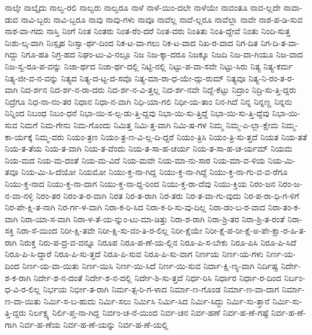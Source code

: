 {ನಾಲ್ಕೇ
ನಾಲ್ಕೈದು
ನಾಲ್ವ-ರಲಿ
ನಾಲ್ವರು
ನಾಲ್ವರೂ
ನಾಳೆ
ನಾಳೆ-ಯಿಂ-ದಲೇ
ನಾಳೆಯೇ
ನಾವಂತೂ
ನಾವ-ಲ್ಲದೇ
ನಾವಾ-ಡುವ
ನಾವಿ-ಬ್ಬರು
ನಾವಿ-ಬ್ಬರೂ
ನಾವು
ನಾವು-ಗಳು
ನಾವೂ
ನಾವೆಲ್ಲ
ನಾವೆ-ಲ್ಲರೂ
ನಾವೆಲ್ಲಾ
ನಾವೇ
ನಾಶ-ಪ-ಡಿ-ಸುವ
ನಾಶ-ವಾ-ಗದು
ನಾಸ್ತಿ
ನಿಂಗೆ
ನಿಂತ
ನಿಂತರು
ನಿಂತ-ರೆಂ-ದರೆ
ನಿಂತ-ವರು
ನಿಂತಿತು
ನಿಂತಿ-ದ್ದೇವೆ
ನಿಂತು
ನಿಂದಿ-ಸುತ್ತ
ನಿಃಶು-ಲ್ಕ-ವಾಗಿ
ನಿಃಸ್ಪೃಹ
ನಿಃಸ್ವಾ-ರ್ಥ-ದಿಂದ
ನಿಕ-ಟ-ವಾ-ಗಲು
ನಿಕ-ಟ-ವಾದ
ನಿಖ-ರ-ವಾದ
ನಿಗ-ದಿತ
ನಿಗ-ದಿ-ತ-ವಾ-ಗಿದ್ದು
ನಿಗೂ-ಹತಿ
ನಿಗ್ರ-ಹದ
ನಿಘಂ-ಟು-ವಿ-ನಲ್ಲೂ
ನಿಜ
ನಿಜ-ಕ್ಕಾ-ದರೂ
ನಿಜಕ್ಕೂ
ನಿಜದಿ
ನಿಜ-ವಾ-ಗಿಯೂ
ನಿಜ-ವಾದ
ನಿಜ-ಸ್ವ-ರೂ-ಪ-ವನ್ನು
ನಿಜಾ-ರ್ಥದ
ನಿಜಾ-ರ್ಥ-ದಲ್ಲಿ
ನಿಟ್ಟಿ-ನಲ್ಲಿ
ನಿಟ್ಟು-ಪ-ವಾ-ಸವೇ
ನಿಟ್ಟು-ಸಿರು
ನಿತ್ಯ
ನಿತ್ಯ-ಕರ್ಮ
ನಿತ್ಯ-ಜೀ-ವ-ನ-ವನ್ನು
ನಿತ್ಯದ
ನಿತ್ಯ-ದ-ಟ್ಟ-ದ-ಸವೊ
ನಿತ್ಯ-ಮಾ-ರಾ-ಧ-ಯೇ-ದ್ಗು-ರುಮ್
ನಿತ್ಯವೂ
ನಿತ್ಯ-ನಿ-ರಂ-ತ-ರ-ವಾಗಿ
ನಿದ-ರ್ಶನ
ನಿದ-ರ್ಶ-ನ-ರಾ-ದರು
ನಿದ-ರ್ಶ-ನ-ವಿ-ತ್ತಲ್ಲ
ನಿದ-ರ್ಶ-ನವೇ
ನಿದ್ದೆ-ಕೆಟ್ಟು
ನಿದ್ರಾಂ
ನಿದ್ರಿ-ಸು-ತ್ತಿ-ದ್ದರು
ನಿದ್ರೆಗೂ
ನಿಧ-ನಾ-ನಂ-ತರ
ನಿಧಾನ
ನಿಧಾ-ನ-ವಾಗಿ
ನಿಧಿ-ಯಾ-ಗಲಿ
ನಿಧೀ-ಯ-ತಾಂ
ನಿನ-ಗಿದೆ
ನಿನ್ನ
ನಿನ್ನಣ್ಣ
ನಿನ್ನನು
ನಿನ್ನಿಂದ
ನಿಬಂಧ
ನಿಬಂ-ಧನೆ
ನಿಭಾ-ಯಿ-ಸ-ಲ್ಪ-ಡು-ತ್ತಿ-ದ್ದವು
ನಿಭಾ-ಯಿ-ಸು-ತ್ತಿದ್ದೆ
ನಿಭಾ-ಯಿ-ಸು-ತ್ತಿ-ದ್ದೆವು
ನಿಭಾ-ಯಿ-ಸುವ
ನಿಮಗೆ
ನಿಮ-ಗೇನು
ನಿಮ-ಗೊಂದು
ನಿಮಿತ್ತ
ನಿಮಿ-ತ್ತ-ವಾಗಿ
ನಿಮಿ-ಷ-ಗಳ
ನಿಮ್ಮ
ನಿಮ್ಮ-ಎ-ಲ್ಲಾ-ಕ್ಷೇಮ
ನಿಮ್ಮ-ಕಾ-ರ್ಯಕ್ಕೆ
ನಿಮ್ಮ-ವರು
ನಿಯಂ-ತ್ರಣ
ನಿಯಂ-ತ್ರ-ಣ-ವಿ-ಲ್ಲ-ದಿ-ದ್ದರೆ
ನಿಯಂ-ತ್ರಿಸಿ
ನಿಯಂ-ತ್ರಿ-ಸು-ತ್ತದೆ
ನಿಯತ
ನಿಯ-ತತೆ
ನಿಯ-ತ-ತೆಯ
ನಿಯ-ತ-ವಾಗಿ
ನಿಯ-ತ-ವೆಂದು
ನಿಯ-ತ-ಸಾ-ಹ-ಚರ್ಯ
ನಿಯ-ತ-ಸಾ-ಹ-ಚ-ರ್ಯಮ್
ನಿಯಮ
ನಿಯ-ಮದ
ನಿಯ-ಮ-ದಂತೆ
ನಿಯ-ಮ-ವಿದೆ
ನಿಯ-ಮವೇ
ನಿಯ-ಮಾ-ನು-ಸಾರ
ನಿಯ-ಮಾ-ವ-ಳಿಯ
ನಿಯ-ಮಿ-ತವೂ
ನಿಯ-ಮಿ-ಸಿ-ದೆಯೋ
ನಿಯಮೋ
ನಿಯು-ಕ್ತ-ನಾ-ಗಿದ್ದ
ನಿಯು-ಕ್ತ-ನಾ-ಗಿದ್ದೆ
ನಿಯು-ಕ್ತ-ನಾ-ಗು-ವ-ವ-ರೆಗೂ
ನಿಯು-ಕ್ತ-ನಾದ
ನಿಯು-ಕ್ತ-ನಾ-ದಾಗ
ನಿಯು-ಕ್ತ-ನಾ-ದ್ದ-ರಿಂದ
ನಿಯು-ಕ್ತ-ರಾ-ದೆವು
ನಿಯು-ಕ್ತಿಯ
ನಿರಂ-ಜನ
ನಿರಂ-ಜ-ನ-ವಾ-ನಳ್ಳಿ
ನಿರಂ-ತರ
ನಿರಂ-ತ-ರ-ವಾಗಿ
ನಿರತ
ನಿರ-ತ-ರಾಗಿ
ನಿರ-ತರು
ನಿರ-ತ-ವಾ-ಗು-ವುದು
ನಿರ-ಪ-ರಾ-ಧಿ-ಗ-ಳಿಗೆ
ನಿರ-ಪೇ-ಕ್ಷಿ-ತ-ನಾಗಿ
ನಿರ-ರ್ಗ-ಳ-ವಾಗಿ
ನಿರಾ-ಕ-ರಿ-ಸಿದ
ನಿರಾ-ಕ-ರಿ-ಸು-ವು-ದಿಲ್ಲ
ನಿರಾ-ಡಂ-ಬ-ರ-ವಾದ
ನಿರಾ-ತಂ-ಕ-ವಾಗಿ
ನಿರಾ-ಯಾ-ಸ-ವಾಗಿ
ನಿರಾ-ಳ-ತೆ-ಯ-ನ್ನುಂ-ಟು-ಮಾ-ಡಿತ್ತು
ನಿರಾ-ಶ-ರಾಗಿ
ನಿರಾ-ಶ್ರಿ-ತರ
ನಿರಾ-ಶ್ರಿ-ತ-ರಂತೆ
ನಿರಾ-ಸಕ್ತಿ
ನಿರಾ-ಸೆ-ಯಿಂದ
ನಿರೀ-ಕ್ಷಿ-ತವೇ
ನಿರೀ-ಕ್ಷಿ-ಸು-ವಂ-ತಿ-ರ-ಲಿಲ್ಲ
ನಿರೀ-ಕ್ಷೆಯೇ
ನಿರೀ-ಕ್ಷೆ-ಪ-ರೀ-ಕ್ಷೆ-ಅ-ಪೇ-ಕ್ಷಾ-ರ-ಹಿ-ತ-ರಾಗಿ
ನಿರುಕ್ತ
ನಿರು-ಪ-ದ್ರ-ವ-ವನ್ನೂ
ನಿರೂಪ
ನಿರೂ-ಪ-ಣೆ-ಯ-ಲ್ಲಿನ
ನಿರೂ-ಪಿ-ಸ-ಬೇಕು
ನಿರೂ-ಪಿಸಿ
ನಿರೂ-ಪಿ-ಸಿದೆ
ನಿರೂ-ಪಿ-ಸಿ-ದ್ದಾರೆ
ನಿರೂ-ಪಿ-ಸು-ತ್ತದೆ
ನಿರೂ-ಪಿ-ಸುವ
ನಿರೂ-ಪಿ-ಸು-ವಾಗ
ನಿರ್ಣಯ
ನಿರ್ಣ-ಯ-ಗಳು
ನಿರ್ಣ-ಯ-ದಿಂದ
ನಿರ್ಣ-ಯ-ವಾ-ಯಿತು
ನಿರ್ಣ-ಯಿಸಿ
ನಿರ್ಣ-ಯಿ-ಸಿದೆ
ನಿರ್ಣ-ಯಿ-ಸುವ
ನಿರ್ದಾ-ಕ್ಷಿ-ಣ್ಯ-ವಾಗಿ
ನಿರ್ದಿಷ್ಟ
ನಿರ್ದೇ-ಶ-ಕ-ರಾಗಿ
ನಿರ್ದೇ-ಶ-ನ-ದಂತೆ
ನಿರ್ದೇ-ಶ-ನ-ದಲ್ಲಿ
ನಿರ್ದೇ-ಶಿ-ಸು-ತ್ತದೆ
ನಿರ್ಧ-ರಿಸಿ
ನಿರ್ಧಾರ
ನಿರ್ಧಾ-ರ-ದಿಂದ
ನಿರ್ಬಂ-ಧ-ವಿ-ರ-ಲಿಲ್ಲ
ನಿರ್ಭಯ
ನಿರ್ಭೀ-ತ-ರಾಗಿ
ನಿರ್ಮ-ತ್ಸ-ರಿ-ಗ-ಳಾದ
ನಿರ್ಮಾ-ಣ-ಗೊಂಡ
ನಿರ್ಮಾ-ಣ-ವಾ-ದಾಗ
ನಿರ್ಮಾ-ಣ-ವಾ-ಯಿತು
ನಿರ್ಮಿ-ಸ-ಬ-ಹುದು
ನಿರ್ಮಿ-ಸಲು
ನಿರ್ಮಿಸಿ
ನಿರ್ಮಿ-ಸಿದ
ನಿರ್ಮಿ-ಸಿದ್ದು
ನಿರ್ಮಿ-ಸು-ತ್ತಾನೆ
ನಿರ್ಮಿ-ಸು-ತ್ತಿ-ದ್ದರು
ನಿರ್ಲಕ್ಷ್ಯ
ನಿರ್ಲಿ-ಪ್ತ-ನಾ-ಗಿದ್ದ
ನಿರ್ವಂ-ಚ-ನೆ-ಯಿಂದ
ನಿರ್ವ-ಚನ
ನಿರ್ವ-ಹಣೆ
ನಿರ್ವ-ಹ-ಣೆ-ಗಷ್ಟೆ
ನಿರ್ವ-ಹ-ಣೆ-ಗಾಗಿ
ನಿರ್ವ-ಹ-ಣೆಯ
ನಿರ್ವ-ಹ-ಣೆ-ಯನ್ನು
ನಿರ್ವ-ಹ-ಣೆ-ಯಲ್ಲಿ
}
